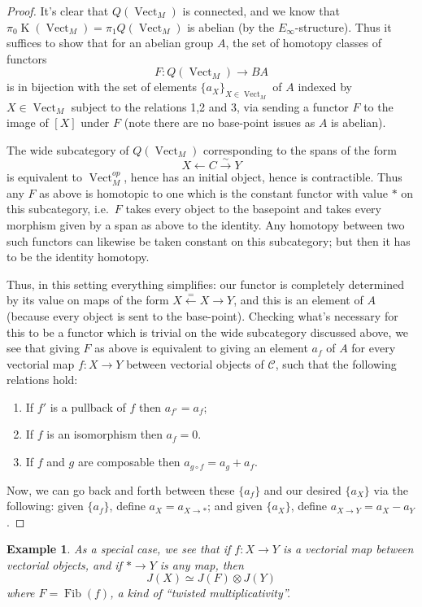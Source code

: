 \documentclass[12pt]{article}
\newtheorem{example}[theorem]{Example}
\newcommand{\on}{\operatorname}
\newcommand{\mc}{\mathcal}
\begin{document}
\begin{proof}
It's clear that $Q(\on{Vect}_M)$ is connected, and we know that $\pi_0\on{K}(\on{Vect}_M)=\pi_1 Q(\on{Vect}_M)$ is abelian (by the $E_\infty$-structure).  Thus it suffices to show that for an abelian group $A$, the set of homotopy classes of functors
$$F:Q(\on{Vect}_M)\to BA$$
is in bijection with the set of elements $\{a_X\}_{X\in\on{Vect}_M}$ of $A$ indexed by $X\in\on{Vect}_M$ subject to the relations 1,2 and 3, via sending a functor $F$ to the image of $[X]$ under $F$ (note there are no base-point issues as $A$ is abelian).

The wide subcategory of $Q(\on{Vect}_M)$ corresponding to the spans of the form
$$X \leftarrow C\overset{\sim}{\to}{Y}$$
is equivalent to $\on{Vect}_M^{op}$, hence has an initial object, hence is contractible.  Thus any $F$ as above is homotopic to one which is the constant functor with value $\ast$ on this subcategory, i.e.\ $F$ takes every object to the basepoint and takes every morphism given by a span as above to the identity.  Any homotopy between two such functors can likewise be taken constant on this subcategory; but then it has to be the identity homotopy.

Thus, in this setting everything simplifies: our functor is completely determined by its value on maps of the form $X\overset{=}{\leftarrow} X\to Y$, and this is an element of $A$ (because every object is sent to the base-point).  Checking what's necessary for this to be a functor which is trivial on the wide subcategory discussed above, we see that giving $F$ as above is equivalent to giving an element $a_f$ of $A$ for every vectorial map $f:X\to Y$ between vectorial objects of $\mc{C}$, such that the following relations hold:
\begin{enumerate}
\item If $f'$ is a pullback of $f$ then $a_{f'}=a_f$;
\item If $f$ is an isomorphism then $a_f=0$.
\item If $f$ and $g$ are composable then $a_{g\circ f}=a_g + a_f$.
\end{enumerate}
Now, we can go back and forth between these $\{a_f\}$ and our desired $\{a_X\}$ via the following: given $\{a_f\}$, define $a_X = a_{X\to \ast}$; and given $\{a_X\}$, define $a_{X\to Y} = a_X - a_Y$.
\end{proof}

\begin{example}
As a special case, we see that if $f:X\to Y$ is a vectorial map between vectorial objects, and if $\ast \to Y$ is any map, then
$$J(X)\simeq J(F)\otimes J(Y)$$
where $F=\on{Fib}(f)$, a kind of ``twisted multiplicativity''.
\end{example}
\end{document}
